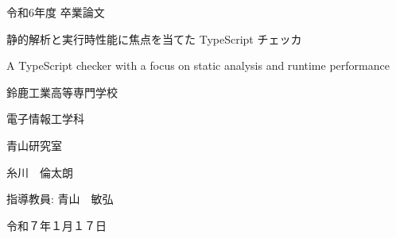 \documentclass[
  luatex,
  paper=a4paper,
  fontsize=11pt,
  report,
  jlreq_notes,
]{jlreq}
\begin{document}
\begin{titlepage}
    \noindent
    \centering

    \vfill

    \LARGE{令和6年度 卒業論文}

    \vspace{10mm}

    \Huge{静的解析と実行時性能に焦点を当てた TypeScript チェッカ}

    \vspace{2mm}

    \LARGE{A TypeScript checker with a focus on static analysis and runtime performance}

    \vfill

    \Large{鈴鹿工業高等専門学校}

    \Large{電子情報工学科}

    \Large{青山研究室}

    \vspace{5mm}

    \LARGE{糸川　倫太朗}

    \vfill

    \Large{指導教員: 青山　敏弘}

    \vspace{2mm}

    \Large{令和７年１月１７日}
\end{titlepage}



\tableofcontents

\clearpage




\end{document}
